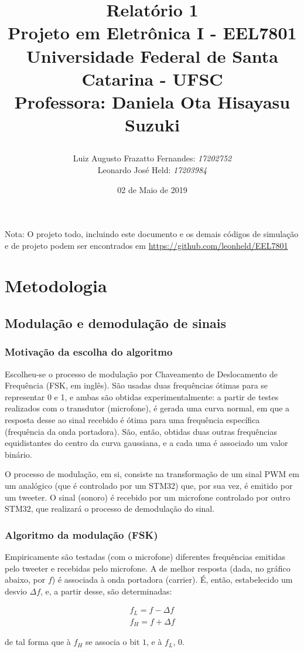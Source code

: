 \documentclass[10pt,a4paper]{report}
\title{Relatório 1  \\
	Projeto em Eletrônica I - EEL7801 \\ \vfill
	\normalsize{Universidade Federal de Santa Catarina - UFSC \\
		Professora: Daniela Ota Hisayasu Suzuki}
	\author{
		{Luiz Augusto Frazatto Fernandes: \it{17202752}} \\
		{Leonardo José Held: \it{17203984}}
	}
}
\date{02 de Maio de 2019}
\begin{document}
	

	\maketitle
		\newpage Nota: O projeto todo, incluindo este documento e os demais códigos de simulação e de projeto podem ser encontrados em \url{https://github.com/leonheld/EEL7801}
	\\
	
	\setcounter{chapter}{0}
	\chapter{Metodologia}
	\section{Modulação e demodulação de sinais}
	\subsection{Motivação da escolha do algoritmo}
	
	Escolheu-se o processo de modulação por Chaveamento de Deslocamento de Frequência (FSK, em inglês). São usadas duas frequências ótimas para se representar 0 e 1, e ambas são obtidas experimentalmente: a partir de testes realizados com o transdutor (microfone), é gerada uma curva normal, em que a resposta desse ao sinal recebido é ótima para uma frequência específica (frequência da onda portadora). São, então, obtidas duas outras frequências equidistantes do centro da curva gaussiana, e a cada uma é associado um valor binário.
	
	
	O processo de modulação, em si, consiste na transformação de um sinal PWM em um analógico (que é controlado por um STM32) que, por sua vez, é emitido por um tweeter. O sinal (sonoro) é recebido por um microfone controlado por outro STM32, que realizará o processo de demodulação do sinal.
	\subsection{Algoritmo da modulação (FSK)}	

	Empiricamente são testadas (com o microfone) diferentes frequências emitidas pelo tweeter e recebidas pelo microfone. A de melhor resposta (dada, no gráfico abaixo, por $f$) é associada à onda portadora (carrier). É, então, estabelecido um desvio $\Delta{f}$, e, a partir desse, são determinadas:
	\begin{center}
		\begin{align*}
		f_L = f - \Delta{f}\\
		f_H = f + \Delta{f}
		\end{align*}
	\end{center}
	de tal forma que à $f_H$ se associa o bit $1$, e à $f_L$, $0$.
	
\end{document}
